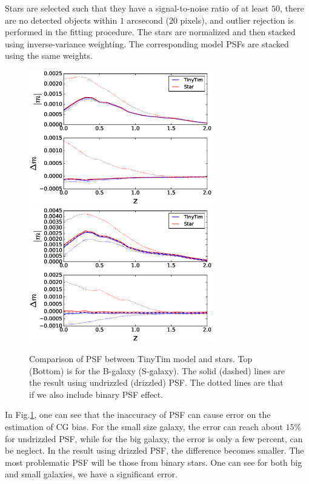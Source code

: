\documentclass[useAMS,usenatbib]{mnras}
\begin{document}
Stars are selected such that they have a signal-to-noise ratio of at
least $50$, there are no detected objects within $1$ arcsecond ($20$
pixels), and outlier rejection is performed in the fitting procedure.
The stars are normalized and then stacked using inverse-variance
weighting. The corresponding model PSFs are stacked using the same
weights.

%



%
\begin{figure}
\includegraphics[width=8.0cm]{ztinytim_b.eps}
\includegraphics[width=8.0cm]{ztinytim_s.eps}
\caption{Comparison of PSF between TinyTim model and stars.
  Top (Bottom) is for the B-galaxy (S-galaxy). The solid (dashed) 
  lines are the result using undrizzled (drizzled) PSF. 
  The dotted lines are that if we also include binary PSF effect.}
\label{fig:psfacc2}
\end{figure}
%
In Fig.\ref{fig:psfacc2}, one can see that the inaccuracy of PSF can
cause error on the estimation of CG bias. For the small size galaxy,
the error can reach about $15\%$ for undrizzled PSF, while for the big
galaxy, the error is only a few percent, can be neglect. In the result
using drizzled PSF, the difference becomes smaller. The most
problematic PSF will be those from binary stars. One can see for both
big and small galaxies, we have a significant error.
\end{document}
